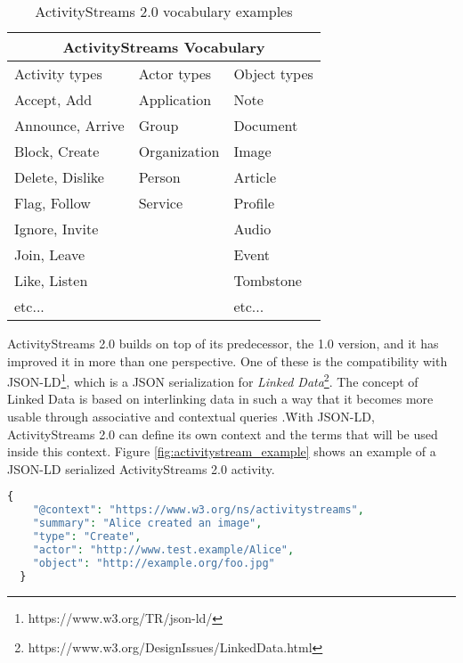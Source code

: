 \begin{table}[!ht]
  \centering
  \begin{tabular}{|p{4cm}|p{4cm}|p{4cm}| }
    \hline
    \multicolumn{3}{|c|}{ActivityStreams Vocabulary} \\
    \hline
    Activity types & Actor types & Object types \\
    \hline
      Accept, Add & Application & Note \\
      Announce, Arrive & Group & Document \\ 
      Block, Create & Organization & Image \\
      Delete, Dislike & Person & Article \\
      Flag, Follow & Service & Profile \\
      Ignore, Invite & & Audio \\
      Join, Leave & & Event \\
      Like, Listen & & Tombstone \\
      etc... & & etc... \\
    \hline
  \end{tabular}
  \caption{ActivityStreams 2.0 vocabulary examples}
  \label{table:activitystreams_vocabulary}
\end{table}

ActivityStreams 2.0 builds on top of its predecessor, the 1.0 version, and it has improved it in more than one perspective. One of these is the compatibility with JSON-LD\footnote{https://www.w3.org/TR/json-ld/}, which is a JSON serialization for \emph{Linked Data}\footnote{https://www.w3.org/DesignIssues/LinkedData.html}. The concept of Linked Data is based on interlinking data in such a way that it becomes more usable through associative and contextual queries \cite{berners-lee_2006}.\. With JSON-LD, ActivityStreams 2.0 can define its own context and the terms that will be used inside this context. Figure \ref{fig:activitystream_example} shows an example of a JSON-LD serialized ActivityStreams 2.0 activity. 

\lstset{style=JSONStyle}
\begin{lstlisting}[language=PHP, caption=Example of activity \cite{snell_prodromou_2017}, label=fig:activitystream_example, float=h]
  {
    "@context": "https://www.w3.org/ns/activitystreams",
    "summary": "Alice created an image",
    "type": "Create",
    "actor": "http://www.test.example/Alice",
    "object": "http://example.org/foo.jpg"
  }
\end{lstlisting}

